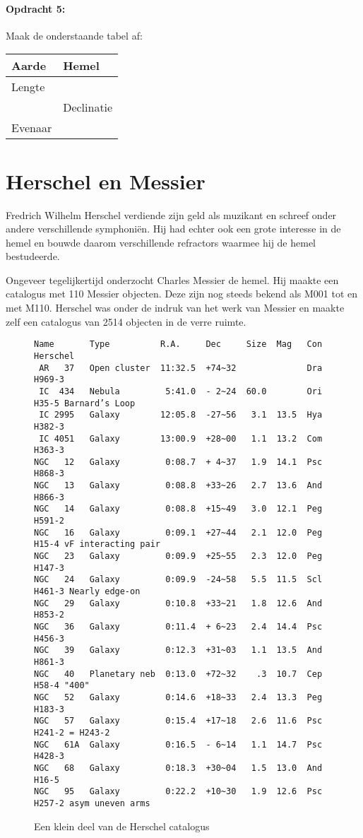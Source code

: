 \paragraph*{Opdracht 5:}

Maak de onderstaande tabel af:

\noindent \begin{flushleft}
\begin{tabular}{|>{\centering}p{5cm}|>{\centering}p{5cm}|}
\hline 
Aarde & Hemel\tabularnewline
\hline 
\hline 
Lengte & \tabularnewline
\hline 
 & Declinatie\tabularnewline
\hline 
Evenaar & \tabularnewline
\hline 
\end{tabular}
\par\end{flushleft}


\section{Herschel en Messier}

Fredrich Wilhelm Herschel verdiende zijn geld als muzikant en schreef
onder andere verschillende symphoniën. Hij had echter ook een grote
interesse in de hemel en bouwde daarom verschillende refractors waarmee
hij de hemel bestudeerde.

Ongeveer tegelijkertijd onderzocht Charles Messier de hemel. Hij maakte
een catalogus met 110 Messier objecten. Deze zijn nog steeds bekend
als M001 tot en met M110. Herschel was onder de indruk van het werk
van Messier en maakte zelf een catalogus van 2514 objecten in de verre
ruimte.

\begin{figure}[h]
\begin{verbatim}
Name       Type          R.A.     Dec     Size  Mag   Con  Herschel
 AR   37   Open cluster  11:32.5  +74~32              Dra  H969-3
 IC  434   Nebula         5:41.0  - 2~24  60.0        Ori  H35-5 Barnard’s Loop
 IC 2995   Galaxy        12:05.8  -27~56   3.1  13.5  Hya  H382-3
 IC 4051   Galaxy        13:00.9  +28~00   1.1  13.2  Com  H363-3
NGC   12   Galaxy         0:08.7  + 4~37   1.9  14.1  Psc  H868-3
NGC   13   Galaxy         0:08.8  +33~26   2.7  13.6  And  H866-3
NGC   14   Galaxy         0:08.8  +15~49   3.0  12.1  Peg  H591-2
NGC   16   Galaxy         0:09.1  +27~44   2.1  12.0  Peg  H15-4 vF interacting pair
NGC   23   Galaxy         0:09.9  +25~55   2.3  12.0  Peg  H147-3
NGC   24   Galaxy         0:09.9  -24~58   5.5  11.5  Scl  H461-3 Nearly edge-on
NGC   29   Galaxy         0:10.8  +33~21   1.8  12.6  And  H853-2
NGC   36   Galaxy         0:11.4  + 6~23   2.4  14.4  Psc  H456-3
NGC   39   Galaxy         0:12.3  +31~03   1.1  13.5  And  H861-3
NGC   40   Planetary neb  0:13.0  +72~32    .3  10.7  Cep  H58-4 "400"
NGC   52   Galaxy         0:14.6  +18~33   2.4  13.3  Peg  H183-3
NGC   57   Galaxy         0:15.4  +17~18   2.6  11.6  Psc  H241-2 = H243-2
NGC   61A  Galaxy         0:16.5  - 6~14   1.1  14.7  Psc  H428-3
NGC   68   Galaxy         0:18.3  +30~04   1.5  13.0  And  H16-5
NGC   95   Galaxy         0:22.2  +10~30   1.9  12.6  Psc  H257-2 asym uneven arms
\end{verbatim}
\caption{Een klein deel van de Herschel catalogus}
\end{figure}


